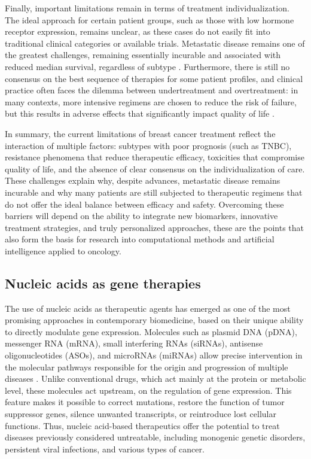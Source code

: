 Finally, important limitations remain in terms of treatment individualization.
The ideal approach for certain patient groups, such as those with low hormone
receptor expression, remains unclear, as these cases do not easily fit into
traditional clinical categories or available trials. Metastatic disease remains
one of the greatest challenges, remaining essentially incurable and associated
with reduced median survival, regardless of subtype
\cite{diff_bca_usa_Howlader2018}. Furthermore, there is still no consensus on
the best sequence of therapies for some patient profiles, and clinical practice
often faces the dilemma between undertreatment and overtreatment: in many
contexts, more intensive regimens are chosen to reduce the risk of failure, but
this results in adverse effects that significantly impact quality of life
\cite{clinical_implication_bca_Adamo2015}.

In summary, the current limitations of breast cancer treatment reflect the
interaction of multiple factors: subtypes with poor prognosis (such as TNBC),
resistance phenomena that reduce therapeutic efficacy, toxicities that
compromise quality of life, and the absence of clear consensus on the
individualization of care. These challenges explain why, despite advances,
metastatic disease remains incurable and why many patients are still subjected
to therapeutic regimens that do not offer the ideal balance between efficacy
and safety. Overcoming these barriers will depend on the ability to integrate
new biomarkers, innovative treatment strategies, and truly personalized
approaches, these are the points that also form the basis for research into computational
methods and artificial intelligence applied to oncology.

\subsection{Nucleic acids as gene therapies}
\label{sec:nucleic_acids_gene_therapies}
The use of nucleic acids as therapeutic agents has emerged as one of the most promising approaches in contemporary biomedicine, based on their unique ability to directly modulate gene expression. Molecules such as plasmid DNA (pDNA), messenger RNA (mRNA), small interfering RNAs (siRNAs), antisense oligonucleotides (ASOs), and microRNAs (miRNAs) allow precise intervention in the molecular pathways responsible for the origin and progression of multiple diseases \cite{_Mendes2022Nanodelivery}. Unlike conventional drugs, which act mainly at the protein or metabolic level, these molecules act upstream, on the regulation of gene expression. This feature makes it possible to correct mutations, restore the function of tumor suppressor genes, silence unwanted transcripts, or reintroduce lost cellular functions. Thus, nucleic acid-based therapeutics offer the potential to treat diseases previously considered untreatable, including monogenic genetic disorders, persistent viral infections, and various types of cancer.

